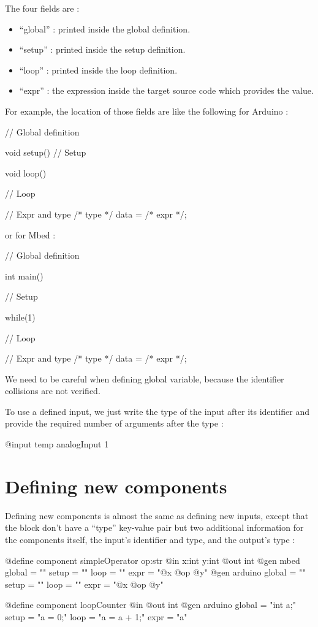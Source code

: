 The four fields are :
\begin{itemize}
\item ``global'' : printed inside the global definition.
\item ``setup'' : printed inside the setup definition.
\item ``loop'' : printed inside the loop definition.
\item ``expr'' : the expression inside the target source code which provides the value.
\end{itemize}

For example, the location of those fields are like the following for Arduino :
\begin{arduinocode}
// Global definition

void setup() {
  // Setup
}

void loop() {
  // Loop

  // Expr and type
  /* type */ data = /* expr */;
}
\end{arduinocode}

or for Mbed :
\begin{cppcode}
// Global definition

int main() {
  // Setup

  while(1) {
    // Loop
    
    // Expr and type
    /* type */ data = /* expr */;
  }
  
}
\end{cppcode}

We need to be careful when defining global variable, because the identifier
collisions are not verified.

To use a defined input, we just write the type of the input after its identifier
and provide the required number of arguments after the type :
\begin{apdlcode}
@input temp analogInput 1
\end{apdlcode}

\section*{Defining new components}

Defining new components is almost the same as defining new inputs, except that
the  block don't have a ``type'' key-value pair but two
additional information for the components itself, the input's identifier and
type, and the output's type :

\begin{apdlcode}
@define component simpleOperator op:str {
    @in x:int y:int
    @out int
    @gen mbed {
        global = ""
        setup = ""
        loop = ""
        expr = "@x @op @y"
    }
    @gen arduino {
        global = ""
        setup = ""
        loop = ""
        expr = "@x @op @y"
    }
}

@define component loopCounter {
    @in
    @out int
    @gen arduino {
        global = "int a;"
        setup = "a = 0;"
        loop = "a = a + 1;"
        expr = "a"
  }
}
\end{apdlcode}

